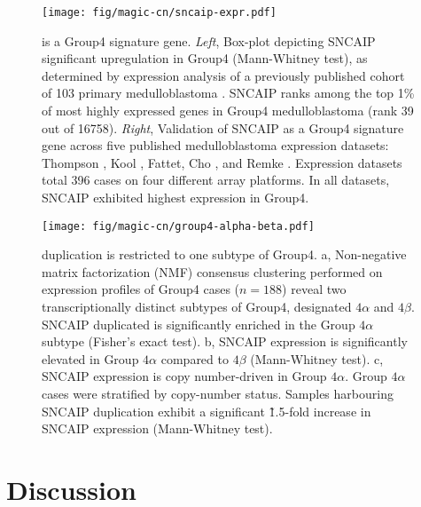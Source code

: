 \begin{figure}[t]
	\begin{center}
		\texttt{[image: fig/magic-cn/sncaip-expr.pdf]}
	\end{center}
	\caption[ is a Group4 signature gene]
	{
	 is a Group4 signature gene.
	\emph{Left}, Box-plot depicting SNCAIP significant upregulation in Group4 (Mann-Whitney test), as determined by expression analysis of a previously published cohort of 103 primary medulloblastoma . SNCAIP ranks among the top 1\% of most highly expressed genes in Group4 medulloblastoma (rank 39 out of 16758).
	\emph{Right}, Validation of SNCAIP as a Group4 signature gene across five published medulloblastoma expression datasets: Thompson , Kool , Fattet, Cho , and Remke . Expression datasets total 396 cases on four different array platforms. In all datasets, SNCAIP exhibited highest expression in Group4.
	}
	\label{fig:sncaip-expr}
\end{figure}

\begin{figure}[b]
	\begin{center}
		\texttt{[image: fig/magic-cn/group4-alpha-beta.pdf]}
	\end{center}
	\caption[ duplication is restricted to one subtype of Group4]
	{
	 duplication is restricted to one subtype of Group4.
	\textsf{a}, Non-negative matrix factorization (NMF) consensus clustering performed on expression profiles of Group4 cases ($n = 188$) reveal two transcriptionally distinct subtypes of Group4, designated $4\alpha$ and $4\beta$. SNCAIP duplicated is significantly enriched in the Group $4\alpha$ subtype (Fisher's exact test).
	\textsf{b}, SNCAIP expression is significantly elevated in Group $4\alpha$ compared to $4\beta$ (Mann-Whitney test).
	\textsf{c}, SNCAIP expression is copy number-driven in Group $4\alpha$. Group $4\alpha$ cases were stratified by  copy-number status. Samples harbouring SNCAIP duplication exhibit a significant \~1.5-fold increase in SNCAIP expression (Mann-Whitney test).
	}
	\label{fig:group4-alpha-beta}
\end{figure}

\clearpage

\section{Discussion}

